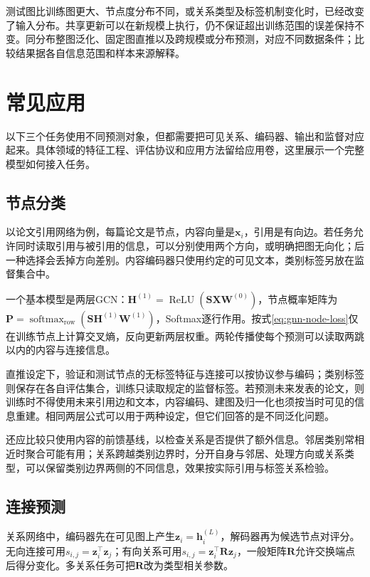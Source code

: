 测试图比训练图更大、节点度分布不同，或关系类型及标签机制变化时，已经改变了输入分布。共享更新可以在新规模上执行，仍不保证超出训练范围的误差保持不变。同分布整图泛化、固定图直推以及跨规模或分布预测，对应不同数据条件；比较结果据各自信息范围和样本来源解释。

\section{常见应用}
\label{sec:gnn-applications}

以下三个任务使用不同预测对象，但都需要把可见关系、编码器、输出和监督对应起来。具体领域的特征工程、评估协议和应用方法留给应用卷，这里展示一个完整模型如何接入任务。

\subsection{节点分类}
\label{sec:gnn-application-node}

以论文引用网络为例，每篇论文是节点，内容向量是$\bm{x}_i$，引用是有向边。若任务允许同时读取引用与被引用的信息，可以分别使用两个方向，或明确把图无向化；后一种选择会丢掉方向差别。内容编码器只使用约定的可见文本，类别标签另放在监督集合中。

一个基本模型是两层GCN：$\bm{H}^{(1)}=\operatorname{ReLU}(\bm{S}\bm{X}\bm{W}^{(0)})$，节点概率矩阵为$\bm{P}=\operatorname{softmax}_{\mathrm{row}}(\bm{S}\bm{H}^{(1)}\bm{W}^{(1)})$，Softmax逐行作用。按式\eqref{eq:gnn-node-loss}仅在训练节点上计算交叉熵，反向更新两层权重。两轮传播使每个预测可以读取两跳以内的内容与连接信息。

直推设定下，验证和测试节点的无标签特征与连接可以按协议参与编码；类别标签则保存在各自评估集合，训练只读取规定的监督标签。若预测未来发表的论文，则训练时不得使用未来引用边和文本，内容编码、建图及归一化也须按当时可见的信息重建。相同两层公式可以用于两种设定，但它们回答的是不同泛化问题。

还应比较只使用内容的前馈基线，以检查关系是否提供了额外信息。邻居类别常相近时聚合可能有用；关系跨越类别边界时，分开自身与邻居、处理方向或关系类型，可以保留类别边界两侧的不同信息，效果按实际引用与标签关系检验。

\subsection{连接预测}
\label{sec:gnn-application-link}

关系网络中，编码器先在可见图上产生$\bm{z}_i=\bm{h}_i^{(L)}$，解码器再为候选节点对评分。无向连接可用$s_{i,j}=\bm{z}_i^{\top}\bm{z}_j$；有向关系可用$s_{i,j}=\bm{z}_i^{\top}\bm{R}\bm{z}_j$，一般矩阵$\bm{R}$允许交换端点后得分变化。多关系任务可把$\bm{R}$改为类型相关参数。

